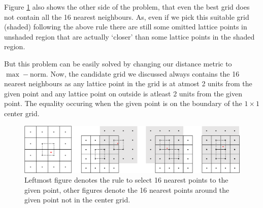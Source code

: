 \documentclass[a4paper, landscape]{article}
\begin{document}
Figure \ref{fig:nearest} also shows the other side of the problem, that even the best grid does not contain all the 16 nearest neighbours. As, even if we pick this suitable grid (shaded) following the above rule there are still some omitted lattice points in unshaded region that are actually `closer' than some lattice points in the shaded region.

But this problem can be easily solved by changing our distance metric to $\max-$norm. Now, the candidate grid we discussed always contains the 16 nearest neighbours as any lattice point in the grid is at atmost 2 units from the given point and any lattice point on outside is atleast 2 units from the given point. The equality occuring when the given point is on the boundary of the $1\times1$ center grid.
\begin{figure}[H]
    \centering
    \includegraphics[width=\linewidth]{nearest_point.pdf}
    \caption{Leftmost figure denotes the rule to select 16 nearest points to the given point, other figures denote the 16 nearest points around the given point not in the center grid.}
    \label{fig:nearest}
\end{figure}
\end{document}
